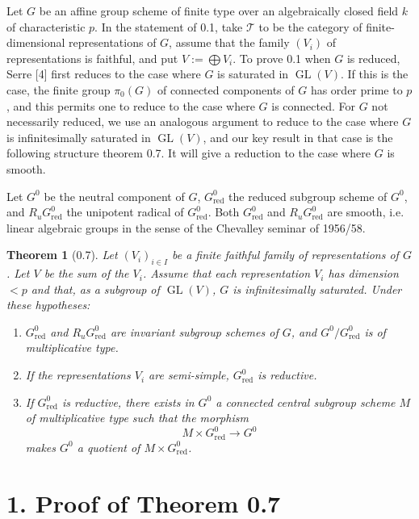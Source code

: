 \documentclass[10pt]{article}
\newcommand{\GL}{\operatorname{GL}}
\newcommand{\Ru}{R_u}
\newcommand{\red}{\mathrm{red}}
\newcommand{\T}{\mathcal T}
\theoremstyle{deligne}
\newtheorem*{theorem*}{Theorem}
\newcommand{\heading}[1]{\vspace{0.7em}\noindent{\bfseries #1}\quad}
\begin{document}
\heading{0.6.} Let \(G\) be an affine group scheme of finite type over an algebraically closed field \(k\) of characteristic \(p\). In the statement of 0.1, take \(\T\) to be the category of finite-dimensional representations of \(G\), assume that the family \((V_i)\) of representations is faithful, and put \(V:=\bigoplus V_i\). To prove 0.1 when \(G\) is reduced, Serre [4] first reduces to the case where \(G\) is saturated in \(\GL(V)\). If this is the case, the finite group \(\pi_0(G)\) of connected components of \(G\) has order prime to \(p\), and this permits one to reduce to the case where \(G\) is connected. For \(G\) not necessarily reduced, we use an analogous argument to reduce to the case where \(G\) is infinitesimally saturated in \(\GL(V)\), and our key result in that case is the following structure theorem 0.7. It will give a reduction to the case where \(G\) is smooth.

Let \(G^0\) be the neutral component of \(G\), \(G^0_{\red}\) the reduced subgroup scheme of \(G^0\), and \(\Ru G^0_{\red}\) the unipotent radical of \(G^0_{\red}\). Both \(G^0_{\red}\) and \(\Ru G^0_{\red}\) are smooth, i.e. linear algebraic groups in the sense of the Chevalley seminar of 1956/58.

\begin{theorem*}[0.7]
Let \((V_i)_{i\in I}\) be a finite faithful family of representations of \(G\). Let \(V\) be the sum of the \(V_i\). Assume that each representation \(V_i\) has dimension \(<p\) and that, as a subgroup of \(\GL(V)\), \(G\) is infinitesimally saturated. Under these hypotheses:
\begin{enumerate}[label=(\roman*)]
\item \(G^0_{\red}\) and \(\Ru G^0_{\red}\) are invariant subgroup schemes of \(G\), and \(G^0/G^0_{\red}\) is of multiplicative type.
\item If the representations \(V_i\) are semi-simple, \(G^0_{\red}\) is reductive.
\item If \(G^0_{\red}\) is reductive, there exists in \(G^0\) a connected central subgroup scheme \(M\) of multiplicative type such that the morphism
\[
  M\times G^0_{\red}\longrightarrow G^0
\]
makes \(G^0\) a quotient of \(M\times G^0_{\red}\).
\end{enumerate}
\end{theorem*}

\section*{1. Proof of Theorem 0.7}
\end{document}
